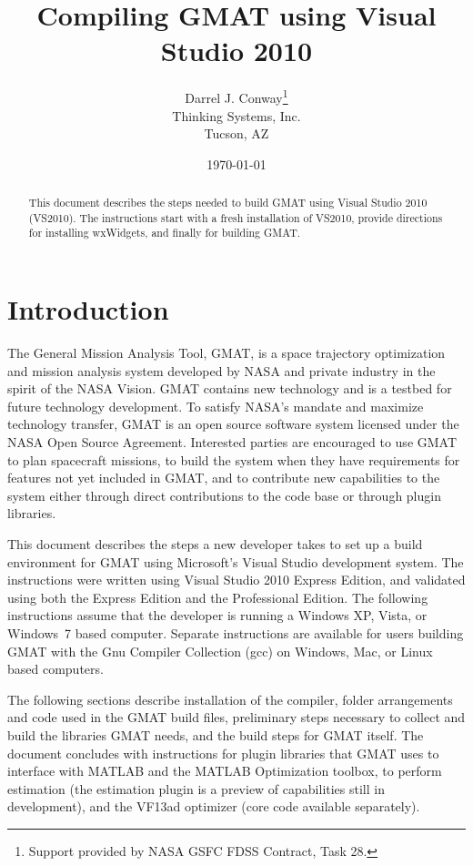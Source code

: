 \documentclass[letterpaper,10pt]{article}%
\begin{document}
\title{Compiling GMAT using Visual Studio 2010}
\author{Darrel J. Conway\thanks{Support provided by NASA GSFC FDSS Contract, Task 28.}
\\Thinking Systems, Inc.\\Tucson, AZ}
\date{\today}
\maketitle

\begin{abstract}
This document describes the steps needed to build GMAT using Visual Studio 2010 (VS2010).  The instructions start with a fresh installation of VS2010, provide directions for installing wxWidgets, and finally for building GMAT. 
\end{abstract}

\section{Introduction}

The General Mission Analysis Tool, GMAT, is a space trajectory optimization and mission analysis system developed by NASA and private industry in the spirit of the NASA Vision. GMAT contains new technology and is a testbed for future technology development. To satisfy NASA's mandate and maximize technology transfer, GMAT is an open source software system licensed under the NASA Open Source Agreement.  Interested parties are encouraged to use GMAT to plan spacecraft missions, to build the system when they have requirements for features not yet included in GMAT, and to contribute new capabilities to the system either through direct contributions to the code base or through plugin libraries.

This document describes the steps a new developer takes to set up a build environment for GMAT using Microsoft's Visual Studio development system.  The instructions were written using Visual Studio 2010 Express Edition, and validated using both the Express Edition and the Professional Edition.  The following instructions assume that the developer is running a Windows XP, Vista, or Windows~7 based computer.  Separate instructions are available for users building GMAT with the Gnu Compiler Collection (gcc) on Windows, Mac, or Linux based computers.

The following sections describe installation of the compiler, folder arrangements and code used in the GMAT build files, preliminary steps necessary to collect and build the libraries GMAT needs, and the build steps for GMAT itself.  The document concludes with instructions for plugin libraries that GMAT uses to interface with MATLAB and the MATLAB Optimization toolbox, to perform estimation (the estimation plugin is a preview of capabilities still in development), and the VF13ad optimizer (core code available separately).
\end{document}
